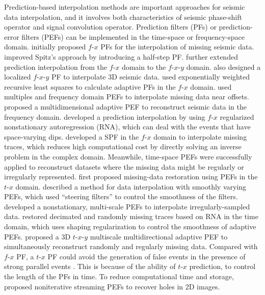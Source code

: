 Prediction-based interpolation methods are important approaches for
seismic data interpolation, and it involves both characteristics of
seismic phase-shift operator and signal convolution
operator. Prediction filters (PFs) or prediction-error filters (PEFs)
can be implemented in the time-space or frequency-space domain.
\cite{Spitz91} initially proposed $f$-$x$ PFs for the interpolation of
missing seismic data.  \cite{Porsani99} improved Spitz's approach by
introducing a half-step PF.  \cite{wang02} further extended prediction
interpolation from the $f$-$x$ domain to the $f$-$x$-$y$ domain.
\cite{Wang07} also designed a localized $f$-$x$-$y$ PF to interpolate
3D seismic data.  \cite{Naghizadeh09} used exponentially weighted
recursive least squares to calculate adaptive PFs in the $f$-$x$
domain. \cite{Curry10} used multiples and frequency domain PEFs to
interpolate missing data near offsets. \cite{Liug17} proposed a
multidimensional adaptive PEF to reconstruct seismic data in the
frequency domain. \cite{Liu18} developed a prediction interpolation by
using $f$-$x$ regularized nonstationary autoregression (RNA), which
can deal with the events that have space-varying dips.  \cite{Zheng19}
developed a SPF in the $f$-$x$ domain to interpolate missing traces,
which reduces high computational cost by directly solving an inverse
problem in the complex domain.  Meanwhile, time-space PEFs were
successfully applied to reconstruct datasets where the missing data
might be regularly or irregularly represented. \cite{Claerbout92}
first proposed missing-data restoration using PEFs in the $t$-$x$
domain.  \cite{Crawley99} described a method for data interpolation
with smoothly varying PEFs, which used ``steering filters'' to control
the smoothness of the filters. \cite{Curry03} developed a
nonstationary, multi-scale PEFs to interpolate irregularly-sampled
data. \cite{Liu11} restored decimated and randomly missing traces
based on RNA in the time domain, which uses shaping regularization to
control the smoothness of adaptive PEFs. \cite{Liug18} proposed a 3D
$t$-$x$-$y$ multiscale multidirectional adaptive PEF to simultaneously
reconstruct randomly and regularly missing data. Compared with $f$-$x$
PF, a $t$-$x$ PF could avoid the generation of false events in the
presence of strong parallel events \cite[]{Abma95}. This is because of
the ability of $t$-$x$ prediction, to control the length of the PFs in
time.  To reduce computational time and storage, \cite{Fomel16}
proposed noniterative streaming PEFs to recover holes in 2D images.

